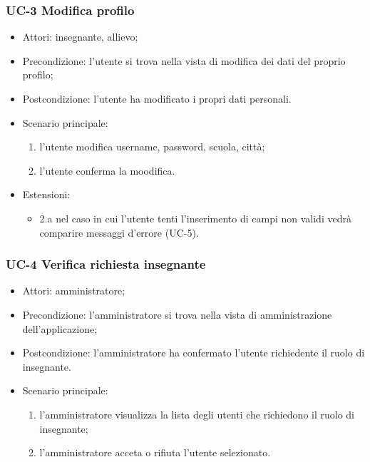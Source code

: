 	\subsubsection{UC-3 Modifica profilo}
		\begin{itemize}
			\item Attori: insegnante, allievo;
			\item Precondizione: l'utente si trova nella vista di modifica dei dati del proprio profilo;
			\item Postcondizione: l'utente ha modificato i propri dati personali.
			\item Scenario principale:
				\begin{enumerate}
					\item l'utente modifica username, password, scuola, città;
					\item l'utente conferma la moodifica.
				\end{enumerate}
				\item Estensioni:
				\begin{itemize}
					\item 2.a nel caso in cui l'utente tenti l'inserimento di campi non validi vedrà comparire messaggi d'errore (UC-5).
				\end{itemize}
		\end{itemize}
		
\subsubsection{UC-4 Verifica richiesta insegnante}
		\begin{itemize}
			\item Attori: amministratore;
			\item Precondizione: l'amministratore si trova nella vista di amministrazione dell'applicazione;
			\item Postcondizione: l'amministratore ha confermato l'utente richiedente il ruolo di insegnante.
			\item Scenario principale:
				\begin{enumerate}
					\item l'amministratore visualizza la lista degli utenti che richiedono il ruolo di insegnante;
					\item l'amministratore acceta o rifiuta l'utente selezionato.
				\end{enumerate}
		\end{itemize}

